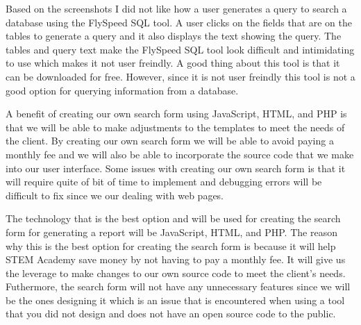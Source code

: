\documentclass[letterpaper,10pt,serif, draftclsnofoot,onecolumn, compsoc, titlepage]{IEEEtran}
\begin{document}

Based on the screenshots I did not like how a user generates a query to search a database using the FlySpeed SQL tool. A user clicks on the fields that are on the tables to generate a query and it also displays the text showing the query. The tables and query text make the FlySpeed SQL tool look difficult and intimidating to use which makes it not user freindly. A good thing about this tool is that it can be downloaded for free. However, since it is not user freindly this tool is not a good option for querying information from a database. 

A benefit of creating our own search form using JavaScript, HTML, and PHP is that we will be able to make adjustments to the templates to meet the needs of the client. By creating our own search form we will be able to avoid paying a monthly fee and we will also be able to incorporate the source code that we make into our user interface. Some issues with creating our own search form is that it will require quite of bit of time to implement and debugging errors will be difficult to fix since we our dealing with web pages. 



The technology that is the best option and will be used for creating the search form for generating a report will be JavaScript, HTML, and PHP. The reason why this is the best option for creating the search form is because it will help STEM Academy save money by not having to pay a monthly fee. It will give us the leverage to make changes to our own source code to meet the client's needs. Futhermore, the search form will not have any unnecessary features since we will be the ones designing it which is an issue that is encountered when using a tool that you did not design and does not have an open source code to the public. 
\end{document}
